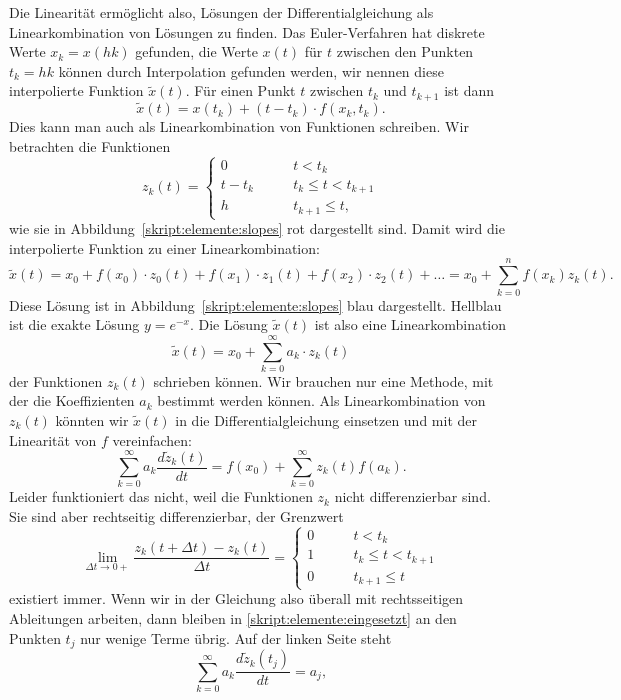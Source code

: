 Die Linearität ermöglicht also, Lösungen der Differentialgleichung
als Linearkombination von Lösungen zu finden.
Das Euler-Verfahren hat diskrete Werte $x_k=x(hk)$ gefunden,
die Werte $x(t)$ für $t$ zwischen den Punkten $t_k=hk$ können
durch Interpolation gefunden werden, wir nennen diese interpolierte
Funktion $\tilde{x}(t)$.
Für einen Punkt $t$ zwischen $t_k$ und $t_{k+1}$ ist dann
\[
\tilde{x}(t) = x(t_k) + (t-t_k)\cdot f(x_k, t_k).
\]
Dies kann man auch als Linearkombination von Funktionen
schreiben.
Wir betrachten die Funktionen
\[
z_k(t)
=
\begin{cases}
0&\qquad t < t_k\\
t-t_k&\qquad t_k \le t < t_{k+1}\\
h&\qquad t_{k+1} \le t,
\end{cases}
\]
wie sie in Abbildung~\ref{skript:elemente:slopes} rot dargestellt sind.
Damit wird die interpolierte Funktion zu einer Linearkombination:
\[
\tilde{x}(t)
=
x_0 + f(x_0)\cdot z_0(t) + f(x_1)\cdot z_1(t) + f(x_2) \cdot z_2(t) + \dots
=
x_0
+
\sum_{k=0}^n f(x_k) z_k(t).
\]
Diese Lösung ist in Abbildung~\ref{skript:elemente:slopes} blau dargestellt.
Hellblau ist die exakte Lösung $y=e^{-x}$.
Die Lösung $\tilde{x}(t)$ ist also eine Linearkombination
\[
\tilde x(t) = x_0 + \sum_{k=0}^\infty a_k\cdot z_k(t)
\]
der Funktionen $z_k(t)$ schrieben können.
Wir brauchen nur eine Methode, mit der die Koeffizienten $a_k$ bestimmt
werden können.
Als Linearkombination von $z_k(t)$ könnten wir $\tilde{x}(t)$ in die 
Differentialgleichung einsetzen und mit der Linearität von $f$ vereinfachen:
\begin{equation}
\sum_{k=0}^\infty
a_k\frac{d\tilde{z}_k(t)}{dt}
=
f(x_0) + \sum_{k=0}^\infty z_k(t) f(a_k).
\label{skript:elemente:eingesetzt}
\end{equation}
Leider funktioniert das nicht, weil die Funktionen $z_k$ nicht differenzierbar
sind.
Sie sind aber rechtseitig differenzierbar, der Grenzwert
\[
\lim_{\Delta t \to 0+} \frac{z_k(t+\Delta t)-z_k(t)}{\Delta t}
=
\begin{cases}
0&\qquad t<t_k\\
1&\qquad t_k\le t< t_{k+1}\\
0&\qquad t_{k+1} \le t
\end{cases}
\]
existiert immer.
Wenn wir in der Gleichung also überall mit rechtsseitigen Ableitungen
arbeiten, dann bleiben in \eqref{skript:elemente:eingesetzt} an den
Punkten $t_j$ nur wenige Terme übrig.
Auf der linken Seite steht
\begin{equation}
\sum_{k=0}^\infty
a_k\frac{d\tilde{z}_k(t_j)}{dt}
=
a_j,
\label{skript:elemente:links}
\end{equation}
